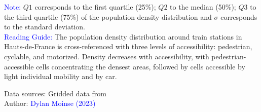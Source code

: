         \begin{table}[h!]
        \centering
        \renewcommand{\arraystretch}{1.5}
    \caption{Distribution of population density based on accessibility levels around train stations in the Hauts-de-France region.}
    \label{table-chap5:analyse-bivariee-densite-accessibilite}
        \vspace{5pt}
        \begin{flushleft}\scriptsize{
        \textcolor{blue}{Note:} \(Q1\) corresponds to the first quartile (25\%); \(Q2\) to the median (50\%); \(Q3\) to the third quartile (75\%) of the population density distribution and $\sigma$ corresponds to the standard deviation.
        \\
        \textcolor{blue}{Reading Guide:} The population density distribution around train stations in Hauts-de-France is cross-referenced with three levels of accessibility: pedestrian, cyclable, and motorized. Density decreases with accessibility, with pedestrian-accessible cells concentrating the densest areas, followed by cells accessible by light individual mobility and by car.
        }\end{flushleft}
        \begin{flushright}\scriptsize
        Data sources: Gridded data from \textcolor{blue}{\textcite{insee_grille_2021}}
        \\
        Author: \textcolor{blue}{Dylan Moinse (2023)}
        \end{flushright}
        \end{table}